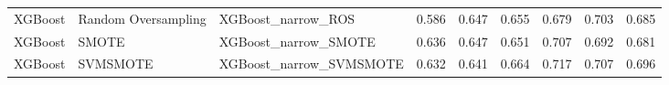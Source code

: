 \begin{tabular}{lllllllll}
                     XGBoost & Random Oversampling &                           XGBoost\_narrow\_ROS & 0.586 &                     0.647 &                 0.655 &                  0.679 &                                   0.703 &    0.685 \\
                     XGBoost &               SMOTE &                         XGBoost\_narrow\_SMOTE & 0.636 &                     0.647 &                 0.651 &                  0.707 &                                   0.692 &    0.681 \\
                     XGBoost &            SVMSMOTE &                      XGBoost\_narrow\_SVMSMOTE & 0.632 &                     0.641 &                 0.664 &                  0.717 &                                   0.707 &    0.696 \\
\bottomrule
\end{tabular}
